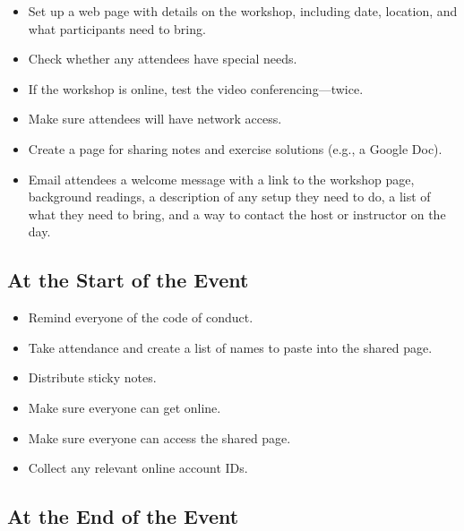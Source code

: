 \begin{itemize}

\item
  Set up a web page with details on the workshop,
  including date,
  location,
  and what participants need to bring.

\item
  Check whether any attendees have special needs.

\item
  If the workshop is online, test the video conferencing---twice.

\item
  Make sure attendees will have network access.

\item
  Create a page for sharing notes and exercise solutions (e.g., a Google Doc).

\item
  Email attendees a welcome message with
  a link to the workshop page,
  background readings,
  a description of any setup they need to do,
  a list of what they need to bring,
  and a way to contact the host or instructor on the day.

\end{itemize}

\subsection*{At the Start of the Event}

\begin{itemize}

\item
  Remind everyone of the code of conduct.

\item
  Take attendance
  and create a list of names to paste into the shared page.

\item
  Distribute sticky notes.

\item
  Make sure everyone can get online.
  
\item
  Make sure everyone can access the shared page.

\item
  Collect any relevant online account IDs.

\end{itemize}

\subsection*{At the End of the Event}

